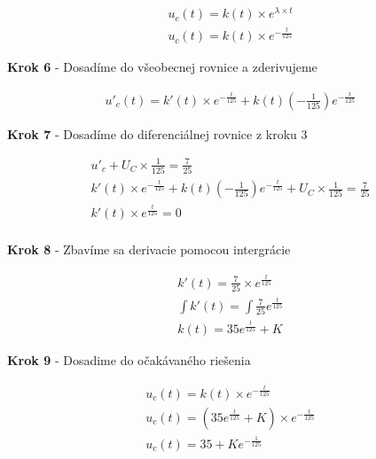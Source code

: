 \begin{gather*}
    u_{c}(t) = k(t) \times e^{\lambda \times t} \\
    u_{c}(t) = k(t) \times e^{-\frac {t}{125}}
\end{gather*}

\begin{center}
    \textbf{Krok 6} - Dosadíme do všeobecnej rovnice a zderivujeme
\end{center}

\begin{gather*}
    u'_{c}(t) = k'(t) \times e^{-\frac {t}{125}} + k(t)(-\frac {1} {125})e^{-\frac {t}{125}}
\end{gather*}

\begin{center}
    \textbf{Krok 7} - Dosadíme do diferenciálnej rovnice z kroku 3
\end{center}

\begin{gather*}
    u'_{c} + U_{C} \times \frac {1} {125} = \frac {7} {25} \\
   k'(t) \times e^{-\frac {t}{125}} + k(t)(-\frac {1} {125})e^{-\frac {t}{125}} + U_{C} \times \frac {1} {125} = \frac {7} {25} \\
    k'(t) \times e^{\frac {t}{125}} = 0 \\
\end{gather*}

\begin{center}
    \textbf{Krok 8} - Zbavíme sa derivacie pomocou intergrácie
\end{center}

\begin{gather*}
    k'(t) = \frac {7} {25} \times e^{\frac {t}{125}} \\
    \int k'(t) = \int \frac {7} {25} e^{\frac {t}{125}} \\
    k(t) = 35e^{\frac{t}{125}} + K
\end{gather*}

\newpage

\begin{center}
    \textbf{Krok 9} - Dosadime do očakávaného riešenia
\end{center}

\begin{gather*}
   u_{c}(t) = k(t) \times e^{-\frac {t}{125}} \\ 
   u_{c}(t) = (35e^{\frac{t}{125}} + K) \times e^{-\frac {t}{125}} \\ 
    u_{c}(t) = 35 + Ke^{-\frac{1}{125}}
\end{gather*}

